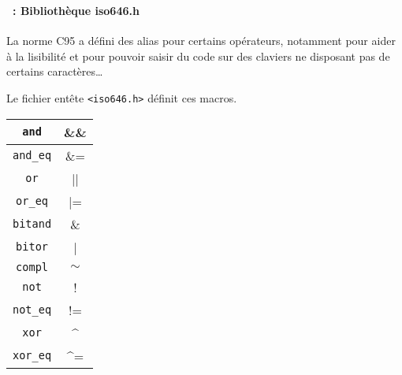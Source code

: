 \begin{frame}[containsverbatim]
  \frametitle{\secname}
  \framesubtitle{\subsecname~: Bibliothèque iso646.h} 

  La norme C95 a défini des alias pour certains opérateurs, notamment pour aider à la lisibilité et pour pouvoir saisir du code sur des claviers ne disposant pas de
  certains caractères\ldots
  \vspace{0.3cm}
  \par
  Le fichier entête \verb|<iso646.h>| définit ces macros.
  \begin{center}
    {\small\begin{tabular}{|c|c|}
      \hline
      \verb|and| & \&\& \\
      \hline
      \verb|and_eq| & \&= \\
      \hline
      \verb|or| & || \\
      \hline
      \verb|or_eq| & |= \\
      \hline
      \verb|bitand| & \& \\
      \hline
      \verb|bitor| & | \\
      \hline
      \verb|compl| & $\sim$ \\
      \hline
      \verb|not| & ! \\
      \hline
      \verb|not_eq| & != \\
      \hline
      \verb|xor| & \^{ } \\
      \hline
      \verb|xor_eq| & \^{ }= \\
      \hline
    \end{tabular}}
  \end{center}
\end{frame}

